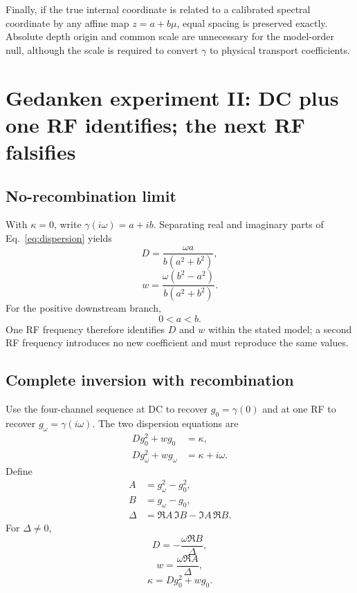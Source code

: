 \documentclass[11pt]{article}
\begin{document}
Finally, if the true internal coordinate is related to a calibrated spectral coordinate by any affine map $z=a+b\mu$, equal spacing is preserved exactly. Absolute depth origin and common scale are unnecessary for the model-order null, although the scale is required to convert $\gamma$ to physical transport coefficients.

\section{Gedanken experiment II: DC plus one RF identifies; the next RF falsifies}

\subsection{No-recombination limit}

With $\kappa=0$, write $\gamma(i\omega)=a+ib$. Separating real and imaginary parts of Eq.~\eqref{eq:dispersion} yields
\begin{equation}
\boxed{D=\frac{\omega a}{b(a^2+b^2)},}
\label{eq:Dsimple}
\end{equation}
\begin{equation}
\boxed{w=\frac{\omega(b^2-a^2)}{b(a^2+b^2)}.}
\label{eq:wsimple}
\end{equation}
For the positive downstream branch,
\begin{equation}
\boxed{0<a<b.}
\end{equation}
One RF frequency therefore identifies $D$ and $w$ within the stated model; a second RF frequency introduces no new coefficient and must reproduce the same values.

\subsection{Complete inversion with recombination}

Use the four-channel sequence at DC to recover $g_0=\gamma(0)$ and at one RF to recover $g_\omega=\gamma(i\omega)$. The two dispersion equations are
\begin{align}
Dg_0^2+wg_0&=\kappa,\\
Dg_\omega^2+wg_\omega&=\kappa+i\omega.
\end{align}
Define
\begin{align}
A&=g_\omega^2-g_0^2,\\
B&=g_\omega-g_0,\\
\Delta&=\Re A\,\Im B-\Im A\,\Re B.
\end{align}
For $\Delta\neq0$,
\begin{equation}
\boxed{D=-\frac{\omega\Re B}{\Delta},}
\label{eq:Drecomb}
\end{equation}
\begin{equation}
\boxed{w=\frac{\omega\Re A}{\Delta},}
\label{eq:wrecomb}
\end{equation}
\begin{equation}
\boxed{\kappa=Dg_0^2+wg_0.}
\label{eq:krecomb}
\end{equation}
\end{document}
